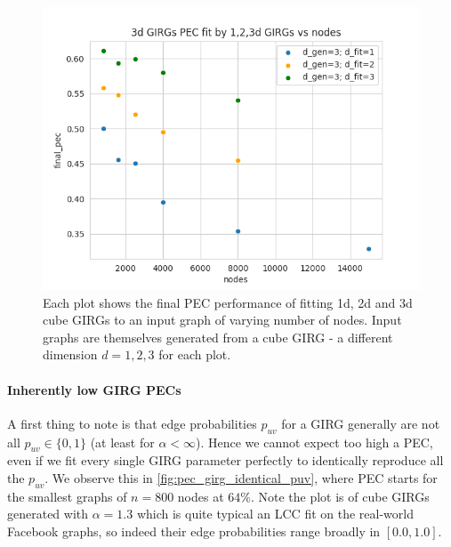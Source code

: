 \begin{figure}
  \parbox[b]{.49\textwidth}{\Large
  \includegraphics[width=\linewidth]{./figures/mcmc_ordered_girggen_d_gen3_pecs.png}
  }
  \hfill
  \parbox[b]{.49\textwidth}{%
  \caption{Each plot shows the final PEC performance of fitting 1d, 2d and 3d cube GIRGs to an input graph of varying number of nodes. Input graphs are themselves generated from a cube GIRG - a different dimension $d=1,2,3$ for each plot.}}

  \label{fig:pec_girggen}
\end{figure}

\paragraph{Inherently low GIRG PECs}
A first thing to note is that edge probabilities $p_{uv}$ for a GIRG generally are not all $p_{uv} \in \{0, 1\}$ (at least for $\alpha < \infty$). Hence we cannot expect too high a PEC, even if we fit every single GIRG parameter perfectly to identically reproduce all the $p_{uv}$. We observe this in \cref{fig:pec_girg_identical_puv}, where PEC starts for the smallest graphs of $n=800$ nodes at $64\%$. Note the plot is of cube GIRGs generated with $\alpha=1.3$ which is quite typical an LCC fit on the real-world Facebook graphs, so indeed their edge probabilities range broadly in $[0.0, 1.0]$.

